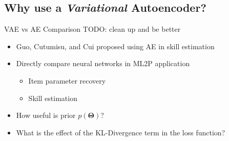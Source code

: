 \documentclass{beamer}
\newcommand{\vect}[1]{\boldsymbol{#1}}
\theoremstyle{definition}
\begin{document}
\subsection{Why use a \textit{Variational} Autoencoder?}

\begin{frame}{VAE vs AE Comparison}
  TODO: clean up and be better %
\begin{itemize}
  \item Guo, Cutumisu, and Cui proposed using AE in skill estimation %
  \item Directly compare neural networks in ML2P application
  \begin{itemize}
    \item Item parameter recovery
    \item Skill estimation
  \end{itemize}
\item<2-> How useful is prior $p(\vect \Theta)$?
\item<2-> What is the effect of the KL-Divergence term in the loss function?
\end{itemize}
\end{frame}

\end{document}
